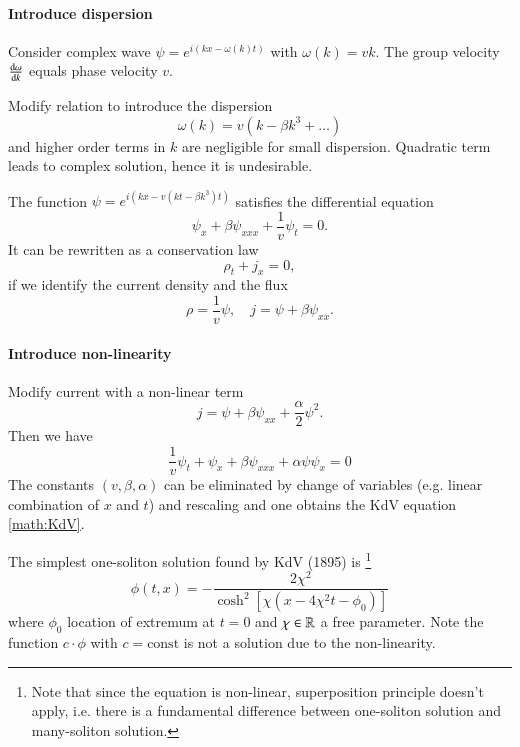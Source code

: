 \paragraph{Introduce dispersion} Consider complex wave $\psi = e^{i(kx - \omega(k)t)}$ with $\omega(k) = vk$. The group velocity $\dv{\omega}{k} $ equals phase velocity $v$.

Modify relation to introduce the dispersion
\begin{equation*}
	\omega(k) = v(k - \beta k^3 + \dots)
\end{equation*}
and higher order terms in $k$ are negligible for small dispersion. Quadratic term leads to complex solution, hence it is undesirable.

The function $\psi = e^{i(kx - v(kt - \beta k^3 )t)}$ satisfies the differential equation
\begin{equation*}
	\psi_{x} + \beta \psi_{x x x} + \frac{1}{v} \psi_t = 0.
\end{equation*}
It can be rewritten as a conservation law
\begin{equation*}
	\rho_t + j_{x} = 0,
\end{equation*}
if we identify the current density and the flux
\begin{equation*}
	\rho = \frac{1}{v} \psi, \quad j = \psi + \beta \psi_{x x}.
\end{equation*}

\paragraph{Introduce non-linearity} Modify current with a non-linear term
\begin{equation*}
	j = \psi + \beta \psi_{x x} + \frac{\alpha}{2} \psi^2 .
\end{equation*}
Then we have 
\begin{equation*}
	\frac{1}{v} \psi_t + \psi_x + \beta \psi_{ x x x} + \alpha \psi \psi_x = 0
\end{equation*}
The constants $(v, \beta, \alpha)$ can be eliminated by change of variables (e.g. linear combination of $x$ and $t$) and rescaling and one obtains the KdV equation \eqref{math:KdV}.

The simplest one-soliton solution found by KdV (1895) is \footnote{Note that since the equation is non-linear, superposition principle doesn't apply, i.e. there is a fundamental difference between one-soliton solution and many-soliton solution.}
\begin{equation}
	\phi (t, x) = - \frac{2\chi^2}{\cosh^2[\chi(x-4\chi^2t - \phi_0)]}
	\label{math:KdV-sol}
\end{equation}
where $\phi_0$ location of extremum at $t=0$ and $\chi\in\mathbb{R}$ a free parameter. Note the function $c \cdot \phi$ with $c=\text{const}$ is not a solution due to the non-linearity.

